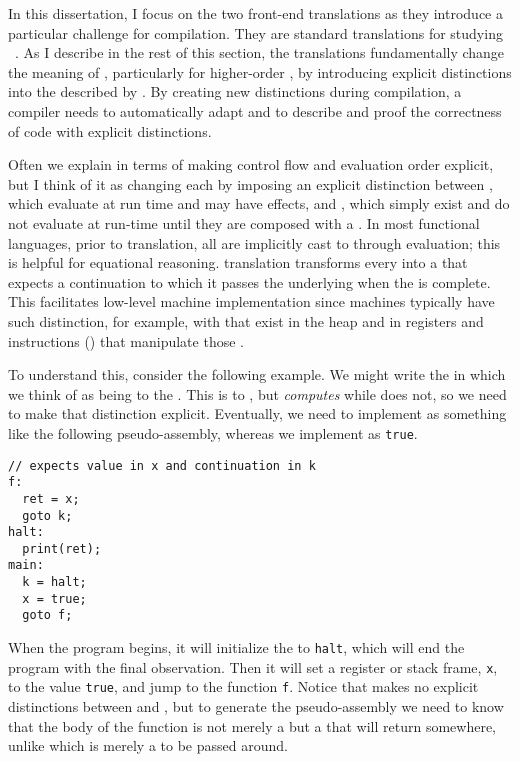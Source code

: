 In this dissertation, I focus on the two front-end translations as
they introduce a particular challenge for  compilation.
They are standard translations for studying ~\cite{minamide1996,barthe1999,shao2005,ahmed2008,chen2010,ahmed2011,new2016}.
As I describe in the rest of this section, the translations fundamentally change
the meaning of , particularly for higher-order ,
by introducing explicit distinctions into the  described by
.
By creating new distinctions during compilation, a 
compiler needs to automatically adapt  and  to
describe and proof the correctness of code with explicit distinctions.

Often we explain  in terms of making control flow and evaluation order
explicit, but I think of it as changing each  by imposing an
explicit distinction between
,
which evaluate at run time and may have effects, and
, which simply exist and do not
evaluate at run-time until they are composed with a .
In most functional languages, prior to  translation, all 
are implicitly cast to  through evaluation; this is helpful for
equational reasoning.
 translation transforms every  into a 
that expects a continuation to which it passes the underlying  when
the  is complete.
This facilitates low-level machine implementation since machines typically have
such distinction, for example, with  that exist in the heap and in
registers and instructions () that manipulate those
.

To understand this, consider the following example.
We might write the  \im{\seone =
  \sappe{(\snfune{\sx}{\sx})}{\struee}} in \slang which we think of as being
 to the  \im{\setwo = \struee}.
This is \emph{} to \im{\struee}, but \im{\seone}
\emph{computes} while \im{\setwo} does not, so we need to make that distinction
explicit.
Eventually, we need to implement \im{\seone} as something like the following
pseudo-assembly, whereas we implement \im{\setwo} as \texttt{true}.
\begin{verbatim}
// expects value in x and continuation in k
f:
  ret = x;
  goto k;
halt:
  print(ret);
main:
  k = halt;
  x = true;
  goto f;
\end{verbatim}
When the program begins, it will initialize the  to
\texttt{halt}, which will end the program with the final observation.
Then it will set a register or stack frame, \texttt{x}, to the value
\texttt{true}, and jump to the function \texttt{f}.
Notice that \im{\snfune{\sx}{\sx}} makes no explicit distinctions between
 and , but to generate the pseudo-assembly we need
to know that the body of the function \im{\sx} is not merely a  but
a  that will return somewhere, unlike \im{\struee} which is
merely a  to be passed around.

